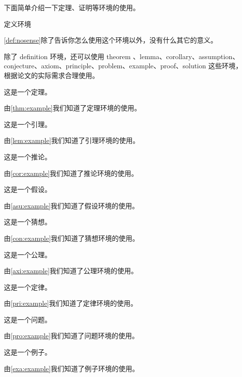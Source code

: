 \documentclass[withoutpreface,bwprint]{cumcmthesis} %
\numberwithin{equation}{subsection}
\begin{document}
下面简单介绍一下定理、证明等环境的使用。
\begin{definition}
    定义环境
    \label{def:nosense}
\end{definition}
\cref{def:nosense}除了告诉你怎么使用这个环境以外，没有什么其它的意义。

除了 definition 环境，还可以使用 theorem 、lemma、corollary、assumption、conjecture、axiom、principle、problem、example、proof、solution 这些环境，根据论文的实际需求合理使用。

\begin{theorem}
    这是一个定理。
    \label{thm:example}
\end{theorem}
由\cref{thm:example}我们知道了定理环境的使用。

\begin{lemma}
    这是一个引理。
    \label{lem:example}
\end{lemma}
由\cref{lem:example}我们知道了引理环境的使用。

\begin{corollary}
    这是一个推论。
    \label{cor:example}
\end{corollary}
由\cref{cor:example}我们知道了推论环境的使用。

\begin{assumption}
    这是一个假设。
    \label{asu:example}
\end{assumption}
由\cref{asu:example}我们知道了假设环境的使用。

\begin{conjecture}
    这是一个猜想。
    \label{con:example}
\end{conjecture}
由\cref{con:example}我们知道了猜想环境的使用。

\begin{axiom}
    这是一个公理。
    \label{axi:example}
\end{axiom}
由\cref{axi:example}我们知道了公理环境的使用。

\begin{principle}
    这是一个定律。
    \label{pri:example}
\end{principle}
由\cref{pri:example}我们知道了定律环境的使用。

\begin{problem}
    这是一个问题。
    \label{pro:example}
\end{problem}
由\cref{pro:example}我们知道了问题环境的使用。

\begin{example}
    这是一个例子。
    \label{exa:example}
\end{example}
由\cref{exa:example}我们知道了例子环境的使用。
\end{document}
